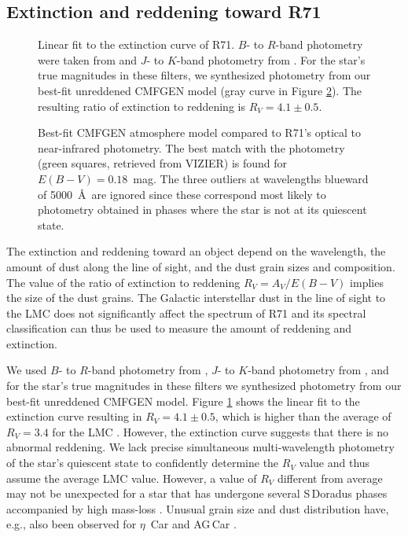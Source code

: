 \documentclass[structabstract]{aa}
\begin{document}
\subsection{Extinction and reddening toward R71}
\label{results:extinction}

\begin{figure}
\centering
{}
     \caption{Linear fit to the extinction curve of R71. $B$- to $R$-band photometry were taken from \citet{2002yCat.2237....0D} and $J$- to $K$-band photometry from \citet{2003yCat.2246....0C}. For the star's true magnitudes in these filters, we synthesized photometry from our best-fit unreddened CMFGEN model (gray curve in Figure \ref{figure:CMFGEN_SED}). The resulting ratio of extinction to reddening is $R_V = 4.1\pm0.5$.}
     \label{figure:RV}
\end{figure}

\begin{figure}
\centering
{}
     \caption{Best-fit CMFGEN atmosphere model compared to R71's optical to near-infrared photometry. The best match with the photometry (green squares, retrieved from VIZIER) is found for $E(B-V)=0.18$~mag. The three outliers at wavelengths blueward of 5000~\AA\ are ignored since these correspond most likely to photometry obtained in phases where the star is not at its quiescent state.}
     \label{figure:CMFGEN_SED}
\end{figure}


The extinction and reddening toward an object depend on the wavelength, the amount of dust along the line of sight, and the dust grain sizes and composition. The value of the ratio of extinction to reddening $R_V = A_V/E(B-V)$ implies the size of the dust grains. The Galactic interstellar dust in the line of sight to the LMC does not significantly affect the spectrum of R71 \citep{1986AJ.....92.1068F} and its spectral classification can thus be used to measure the amount of reddening and extinction. 

We used $B$- to $R$-band photometry from \citet{2002yCat.2237....0D}, $J$- to $K$-band photometry from \citet{2003yCat.2246....0C}, and for the star's true magnitudes in these filters we synthesized photometry from our best-fit unreddened CMFGEN model. 
Figure \ref{figure:RV} shows the linear fit to the extinction curve resulting in $R_V = 4.1 \pm 0.5$, which is higher than the average of $R_V = 3.4$ for the LMC \citep{2003ApJ...594..279G}. However, the extinction curve suggests that there is no abnormal reddening. We lack precise simultaneous multi-wavelength photometry of the star's quiescent state to confidently determine the $R_V$ value and thus assume the average LMC value. However, a value of $R_V$ different from average may not be unexpected for a star that has undergone several S\,Doradus phases accompanied by high mass-loss \citep{1993SSRv...66..207L,1999A&A...341L..67V}. Unusual grain size and dust distribution have, e.g., also been observed for $\eta$~Car \citep{1986MNRAS.222..347M,1992A&A...262..153H} and AG\,Car \citep{2009ApJ...698.1698G}. 
\end{document}
